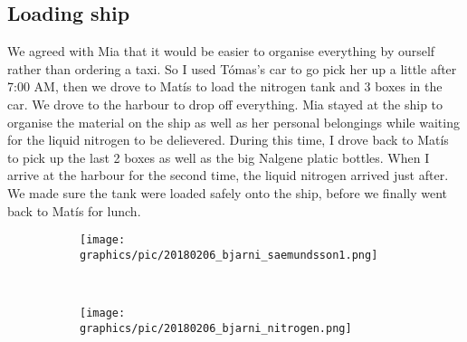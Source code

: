 \subsection{Loading ship}
\label{task:20180206_cj0}

We agreed with Mia that it would be easier to organise everything by ourself rather than ordering a taxi. So I used Tómas's car to go pick her up a little after 7:00 AM, then we drove to Matís to load the nitrogen tank and 3 boxes in the car. We drove to the harbour to drop off everything. Mia stayed at the ship to organise the material on the ship as well as her personal belongings while waiting for the liquid nitrogen to be delievered. During this time, I drove back to Matís to pick up the last 2 boxes as well as the big Nalgene platic bottles. When I arrive at the harbour for the second time, the liquid nitrogen arrived just after. We made sure the tank were loaded safely onto the ship, before we finally went back to Matís for lunch.

\begin{figure}[H] %
    \centering
    \begin{subfigure}[b]{\textwidth}
        \texttt{[image: graphics/pic/20180206\_bjarni\_saemundsson1.png]}
    \end{subfigure}
    \\
    \begin{subfigure}[b]{\textwidth}
        \texttt{[image: graphics/pic/20180206\_bjarni\_nitrogen.png]}
    \end{subfigure}
\end{figure}
